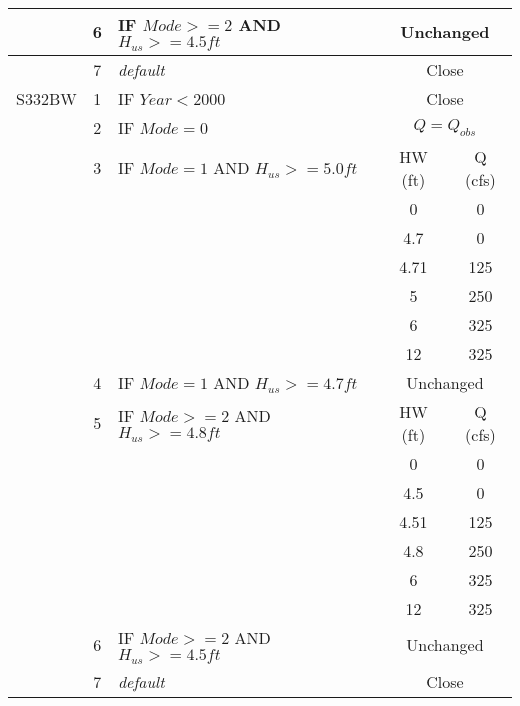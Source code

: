 \begin{table}[!h]
\begin{tabular}{|l|c|l|c|c|}
\hline
              &  6  & IF $Mode>=2$ AND $H_{us}>=4.5ft$             & \multicolumn{2}{|c|}{Unchanged}   \\
\hline
              &  7  & \it{default}                                 & \multicolumn{2}{|c|}{Close}           \\
\hline
\hline
S332BW        &  1  & IF $Year<2000$                               & \multicolumn{2}{|c|}{Close}   \\
\hline
              &  2  & IF $Mode=0$                                  & \multicolumn{2}{|c|}{$Q = Q_{obs}$}   \\
\hline
              &  3  & IF $Mode=1$ AND $H_{us}>=5.0ft$              & HW (ft) & Q (cfs)  \\
              &     &                                              & 0    &  0   \\
              &     &                                              & 4.7  &  0 \\
              &     &                                              & 4.71 &  125 \\
              &     &                                              & 5    &  250 \\
              &     &                                              & 6    &  325 \\
              &     &                                              & 12   &  325 \\
\hline
              &  4  & IF $Mode=1$ AND $H_{us}>=4.7ft$              & \multicolumn{2}{|c|}{Unchanged}   \\
\hline
              &  5  & IF $Mode>=2$ AND $H_{us}>=4.8ft$             & HW (ft) & Q (cfs)  \\
              &     &                                              & 0    &  0   \\
              &     &                                              & 4.5  &  0 \\
              &     &                                              & 4.51 &  125 \\
              &     &                                              & 4.8  &  250 \\
              &     &                                              & 6    &  325 \\
              &     &                                              & 12   &  325 \\
\hline
              &  6  & IF $Mode>=2$ AND $H_{us}>=4.5ft$             & \multicolumn{2}{|c|}{Unchanged}   \\
\hline
              &  7  & \it{default}                                 & \multicolumn{2}{|c|}{Close}           \\
\hline
\hline
\end{tabular}
\end{table}
\normalsize


